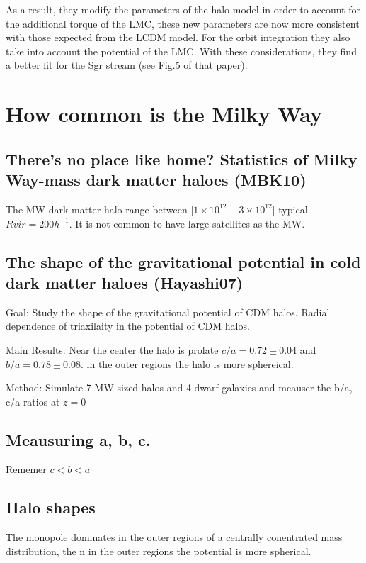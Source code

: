 \documentclass[16pt]{article}
\begin{document}
As a result, they modify the parameters of the halo model in order to account
for the additional torque of the LMC, these new parameters are now more consistent
 with those expected from the LCDM model. For the orbit integration they also take
into account the potential of the LMC. With these considerations, they find a better fit for  the Sgr
stream (see Fig.5 of that paper).

\section{How common is the Milky Way}

\subsection{There’s no place like home? Statistics of Milky Way-mass dark matter
haloes (MBK10)}

The MW dark matter halo range between [$1\times 10^{12} - 3\times 10^{12}$]
typical $Rvir = 200 h^{-1}$. It is not common to have large satellites as
the MW. 

\subsection{The shape of the gravitational potential in cold dark matter haloes (Hayashi07)}

Goal: Study the shape of the gravitational potential of CDM halos. Radial dependence of triaxilaity in the potential of CDM halos.
 
Main Results: Near the center the halo is prolate $c/a = 0.72 \pm 0.04$
and $b/a = 0.78 \pm 0.08$. in the outer regions the halo is more sphereical.

Method: Simulate 7 MW sized halos and 4 dwarf galaxies and meauser the b/a, c/a ratios at $z=0$
\subsection{Meausuring a, b, c.}

Rememer $c<b<a$

\subsection{Halo shapes}

The monopole dominates in the outer regions of a centrally conentrated mass distribution, the n in the outer
regions the potential is more spherical. 
\end{document}
